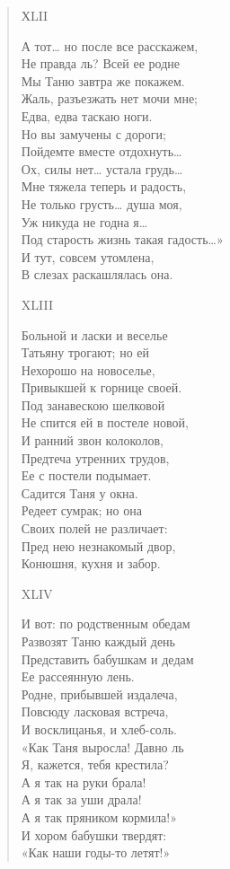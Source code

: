 \begin{verse}
ХLII

А тот… но после все расскажем,\\
Не правда ль? Всей ее родне\\
Мы Таню завтра же покажем.\\
Жаль, разъезжать нет мочи мне;\\
Едва, едва таскаю ноги.\\
Но вы замучены с дороги;\\
Пойдемте вместе отдохнуть…\\
Ох, силы нет… устала грудь…\\
Мне тяжела теперь и радость,\\
Не только грусть… душа моя,\\
Уж никуда не годна я…\\
Под старость жизнь такая гадость…»\\
И тут, совсем утомлена,\\
В слезах раскашлялась она.

XLIII

Больной и ласки и веселье\\
Татьяну трогают; но ей\\
Нехорошо на новоселье,\\
Привыкшей к горнице своей.\\
Под занавескою шелковой\\
Не спится ей в постеле новой,\\
И ранний звон колоколов,\\
Предтеча утренних трудов,\\
Ее с постели подымает.\\
Садится Таня у окна.\\
Редеет сумрак; но она\\
Своих полей не различает:\\
Пред нею незнакомый двор,\\
Конюшня, кухня и забор.

XLIV

И вот: по родственным обедам\\
Развозят Таню каждый день\\
Представить бабушкам и дедам\\
Ее рассеянную лень.\\
Родне, прибывшей издалеча,\\
Повсюду ласковая встреча,\\
И восклицанья, и хлеб-соль.\\
«Как Таня выросла! Давно ль\\
Я, кажется, тебя крестила?\\
А я так на руки брала!\\
А я так за уши драла!\\
А я так пряником кормила!»\\
И хором бабушки твердят:\\
«Как наши годы-то летят!»


\end{verse}
